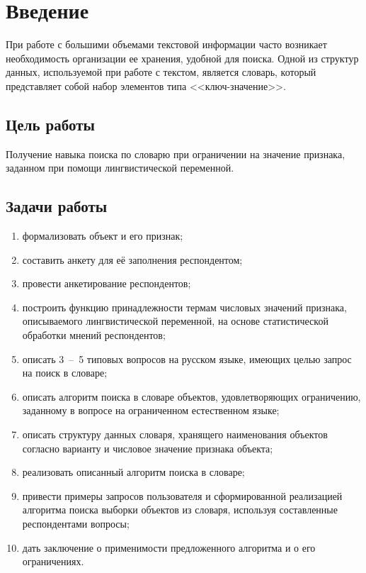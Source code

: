 \setcounter{page}{3}
\chapter*{Введение}

При работе с большими объемами текстовой информации часто возникает необходимость организации ее хранения, удобной для поиска. Одной из структур данных, используемой при работе с текстом, является словарь, который представляет собой набор элементов типа <<ключ-значение>>.

\section*{Цель работы}

Получение навыка поиска по словарю при ограничении на значение признака, заданном при помощи лингвистической переменной.

\section*{Задачи работы}

\begin{enumerate}[label={\arabic*)}]
	\item формализовать объект и его признак;
	\item составить анкету для её заполнения респондентом;
	\item провести анкетирование респондентов;
	\item построить функцию принадлежности термам числовых значений признака, описываемого лингвистической переменной, на основе статистической обработки мнений респондентов;
	\item описать 3~--~5 типовых вопросов на русском языке, имеющих целью запрос на поиск в словаре;
	\item описать алгоритм поиска в словаре объектов, удовлетворяющих ограничению, заданному в вопросе на ограниченном естественном языке;
	\item описать структуру данных словаря, хранящего наименования объектов согласно варианту и числовое значение признака объекта;
	\item реализовать описанный алгоритм поиска в словаре;
	\item привести примеры запросов пользователя и сформированной реализацией алгоритма поиска выборки объектов из словаря, используя составленные респондентами вопросы;
	\item дать заключение о применимости предложенного алгоритма и о его ограничениях.

\end{enumerate}

\newpage